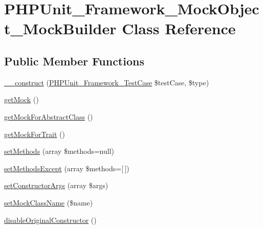 \hypertarget{class_p_h_p_unit___framework___mock_object___mock_builder}{}\section{P\+H\+P\+Unit\+\_\+\+Framework\+\_\+\+Mock\+Object\+\_\+\+Mock\+Builder Class Reference}
\label{class_p_h_p_unit___framework___mock_object___mock_builder}
\subsection*{Public Member Functions}
\begin{DoxyCompactItemize}
\item 
\mbox{\hyperlink{class_p_h_p_unit___framework___mock_object___mock_builder_a9abb798e59d3ebc116f81984cb2b5c73}{\+\_\+\+\_\+construct}} (\mbox{\hyperlink{class_p_h_p_unit___framework___test_case}{P\+H\+P\+Unit\+\_\+\+Framework\+\_\+\+Test\+Case}} \$test\+Case, \$type)
\item 
\mbox{\hyperlink{class_p_h_p_unit___framework___mock_object___mock_builder_a4021b0a3c532357b639924a072fa02c5}{get\+Mock}} ()
\item 
\mbox{\hyperlink{class_p_h_p_unit___framework___mock_object___mock_builder_a372a03ed414fc6235c9a09a39eb17e89}{get\+Mock\+For\+Abstract\+Class}} ()
\item 
\mbox{\hyperlink{class_p_h_p_unit___framework___mock_object___mock_builder_a54f678d907203b42b4c6b81672207d27}{get\+Mock\+For\+Trait}} ()
\item 
\mbox{\hyperlink{class_p_h_p_unit___framework___mock_object___mock_builder_a548378157dd67c01f4aba4c3f4da6fcf}{set\+Methods}} (array \$methods=null)
\item 
\mbox{\hyperlink{class_p_h_p_unit___framework___mock_object___mock_builder_a2774343fbb87e15d47386bca1668c09a}{set\+Methods\+Except}} (array \$methods=\mbox{[}$\,$\mbox{]})
\item 
\mbox{\hyperlink{class_p_h_p_unit___framework___mock_object___mock_builder_ab7b1f718425f0d6b5769b47f8503e8ad}{set\+Constructor\+Args}} (array \$args)
\item 
\mbox{\hyperlink{class_p_h_p_unit___framework___mock_object___mock_builder_a12e6a24e43bbbdb82773d371487aee91}{set\+Mock\+Class\+Name}} (\$name)
\item 
\mbox{\hyperlink{class_p_h_p_unit___framework___mock_object___mock_builder_a0f0df7c285781f715318a0aadbb28c32}{disable\+Original\+Constructor}} ()

\end{DoxyCompactItemize}
